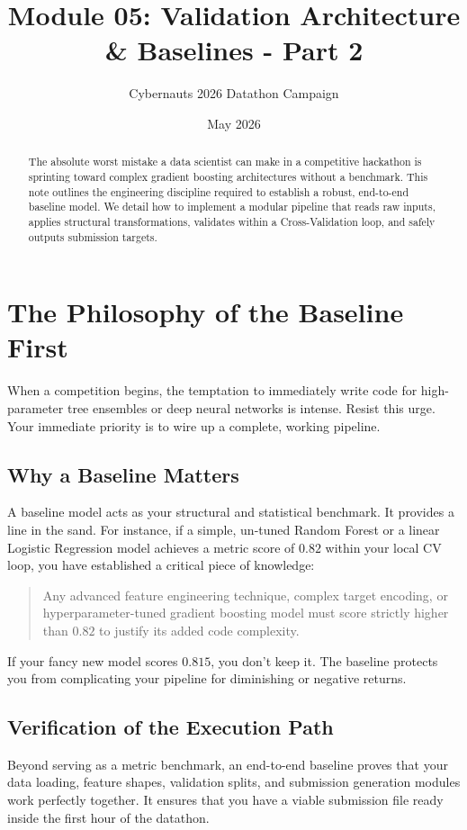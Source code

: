 \documentclass{article}
\title{Module 05: Validation Architecture \& Baselines - Part 2}
\author{Cybernauts 2026 Datathon Campaign}
\date{May 2026}
\begin{document}
\maketitle

\begin{abstract}
The absolute worst mistake a data scientist can make in a competitive hackathon is sprinting toward complex gradient boosting architectures without a benchmark. This note outlines the engineering discipline required to establish a robust, end-to-end baseline model. We detail how to implement a modular pipeline that reads raw inputs, applies structural transformations, validates within a Cross-Validation loop, and safely outputs submission targets.
\end{abstract}

\tableofcontents
\newpage

\section{The Philosophy of the Baseline First}
When a competition begins, the temptation to immediately write code for high-parameter tree ensembles or deep neural networks is intense. Resist this urge. Your immediate priority is to wire up a complete, working pipeline.

\subsection{Why a Baseline Matters}
A baseline model acts as your structural and statistical benchmark. It provides a line in the sand. For instance, if a simple, un-tuned Random Forest or a linear Logistic Regression model achieves a metric score of $0.82$ within your local CV loop, you have established a critical piece of knowledge:
\begin{quote}
Any advanced feature engineering technique, complex target encoding, or hyperparameter-tuned gradient boosting model must score strictly higher than $0.82$ to justify its added code complexity.
\end{quote}
If your fancy new model scores $0.815$, you don't keep it. The baseline protects you from complicating your pipeline for diminishing or negative returns.

\subsection{Verification of the Execution Path}
Beyond serving as a metric benchmark, an end-to-end baseline proves that your data loading, feature shapes, validation splits, and submission generation modules work perfectly together. It ensures that you have a viable submission file ready inside the first hour of the datathon.
\end{document}
